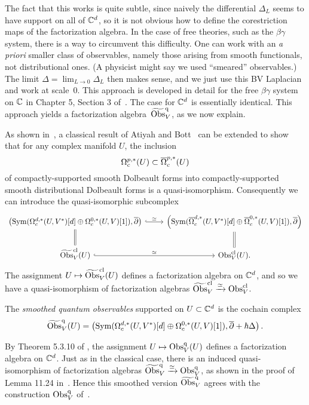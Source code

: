 The fact that this works is quite subtle, since naively the differential $\Delta_L$ seems to have support on all of $\CC^d$, so it is not obvious how to define the corestriction maps of the factorization algebra. 
In the case of free theories, such as the $\beta\gamma$ system, there is a way to circumvent this difficulty. 
One can work with an {\it a priori} smaller class of observables, namely those arising from smooth functionals, not distributional ones.
(A physicist might say we used ``smeared'' observables.)
The limit $\Delta = \lim_{L \to 0} \Delta_L$ then makes sense, and we just use this BV Laplacian and work at scale~0. 
This approach is developed in detail for the free $\beta\gamma$ system on $\CC$ in Chapter 5, Section 3 of~\cite{CG1}. 
The case for $\CC^d$ is essentially identical. 
This approach yields a factorization algebra~$\Tilde{\Obs}^\q_V$, as we now explain.

As shown in~\cite{CG1},
a classical result of Atiyah and Bott~\cite{AB} can be extended to show that for any complex manifold $U$, 
the inclusion
\[
\Omega^{p,*}_c(U) \subset \Bar{\Omega}^{p,*}_c(U)
\]
of compactly-supported smooth Dolbeault forms into compactly-supported smooth distributional Dolbeault forms is a quasi-isomorphism. 
Consequently we can introduce the quasi-isomorphic subcomplex 
\[
\begin{tikzcd}    
 \left(\Sym(\Omega^{d,*}_c(U,V^*)[d] \oplus \Omega^{0,*}_c(U,V)[1]), \dbar\right) \arrow[hook]{r}{\simeq} & \left(\Sym(\Bar{\Omega}^{d,*}_c(U,V^*)[d] \oplus \Bar{\Omega}^{0,*}_c(U,V)[1]), \dbar \right) \\ \Tilde{\Obs}^{\cl}_V(U) \arrow[equals]{u} \arrow[hook]{r}{\simeq} & \Obs_V^{\cl}(U)  \arrow[equals]{u} .
\end{tikzcd}
\]
The assignment $U \mapsto \Tilde{\Obs}^{\cl}_V(U)$ defines a factorization algebra on $\CC^d$, 
and so we have a quasi-isomorphism of factorization algebras $\Tilde{\Obs}^{\cl}_V \xto{\simeq} \Obs^{\cl}_V$.


\begin{dfn}
The {\em smoothed quantum observables} supported on $U \subset \CC^d$ is the cochain complex
\[
\Tilde{\Obs}^\q_V(U) = \left(\Sym(\Omega^{d,*}_c(U,V^*)[d] \oplus \Omega^{0,*}_c(U,V)[1]), \dbar + \hbar \Delta\right) .
\]
\end{dfn}

By Theorem 5.3.10 of \cite{GwThesis}, the assignment $U \mapsto \Obs^\q_V(U)$ defines a factorization algebra on $\CC^d$. 
Just as in the classical case, there is an induced quasi-isomorphism of factorization algebras $\Tilde{\Obs}^\q_{V} \xto{\simeq} \Obs^\q_V$,
as shown in the proof of Lemma 11.24 in~\cite{GGW}. 
Hence this smoothed version $\Tilde{\Obs}^\q_{V}$ agrees with the construction $\Obs^\q_V$ of~\cite{CG2}.

